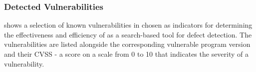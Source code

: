 



\subsubsection{Detected Vulnerabilities}
 shows a selection of known vulnerabilities in \libpng chosen as indicators for determining
the effectiveness and efficiency of \xmlmate as a search-based tool for defect detection. The vulnerabilities are
listed alongside the corresponding vulnerable program version and their CVSS - a score on a scale from 0 to 10
that indicates the severity of a vulnerability.

